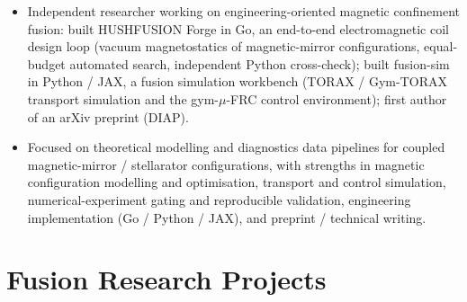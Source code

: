 \documentclass[10pt,a4paper]{article}
\newcommand{\resumeItem}[1]{\item \small #1}
\begin{document}
\begin{itemize}[leftmargin=0.15in, topsep=2pt]
\resumeItem{Independent researcher working on engineering-oriented magnetic confinement fusion: built HUSHFUSION Forge in Go, an end-to-end electromagnetic coil design loop (vacuum magnetostatics of magnetic-mirror configurations, equal-budget automated search, independent Python cross-check); built fusion-sim in Python / JAX, a fusion simulation workbench (TORAX / Gym-TORAX transport simulation and the gym-$\mu$-FRC control environment); first author of an arXiv preprint (DIAP).}
\resumeItem{Focused on theoretical modelling and diagnostics data pipelines for coupled magnetic-mirror / stellarator configurations, with strengths in magnetic configuration modelling and optimisation, transport and control simulation, numerical-experiment gating and reproducible validation, engineering implementation (Go / Python / JAX), and preprint / technical writing.}
\end{itemize}

\section{Fusion Research Projects}
\end{document}
